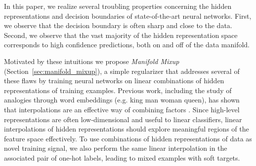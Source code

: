 \documentclass{article} \usepackage[preprint]{nips_2018}
\newcommand{\manifoldmixup}{\textit{Manifold Mixup}}
\begin{document}
\iffalse
\begin{figure*}[t!]
  \centering
  \texttt{[image: figures/2d\_analytical/mm\_new\_figure\_1\_a.png]}
  \caption{An experiment on a network trained on the 2D spiral dataset with a 2D bottleneck hidden representation in the middle of the network. Manifold mixup has three effects on learning when compared to vanilla training. First, it smoothens decision boundaries (from a. to b.). Second, it improves the arrangement of hidden representations and encourages broader regions of low-confidence predictions (from d. to e.).  Third, it flattens the representations (c. at layer 1, f. at layer 3). Figure \ref{appendix:figure:variousregs} shows that these effects are not accomplished by other well-studied regularizers (input mixup, weight decay, dropout, batch normalization, and adding noise to the hidden representations).}
  \label{fig:2dbottleneck}
\end{figure*}
\fi

In this paper, we realize several troubling properties concerning the hidden representations and decision boundaries of state-of-the-art neural networks.
First, we observe that the decision boundary is often sharp and close to the data.
Second, we observe that the vast majority of the hidden representation space corresponds to high confidence predictions, both on and off of the data manifold.

Motivated by these intuitions we propose \manifoldmixup{} (Section~\ref{sec:manifold_mixup}), a simple regularizer that addresses several of these flaws by training neural networks on linear combinations of hidden representations of training examples. 
Previous work, including the study of analogies through word embeddings (e.g. king  man  woman  queen), has shown that interpolations are an effective way of combining factors \citep{mikolov2013wordembed}.  
Since high-level representations are often low-dimensional and useful to linear classifiers, linear interpolations of hidden representations should explore meaningful regions of the feature space effectively.
To use combinations of hidden representations of data as novel training signal, we also perform the same linear interpolation in the associated pair of one-hot labels, leading to mixed examples with soft targets.
\end{document}
